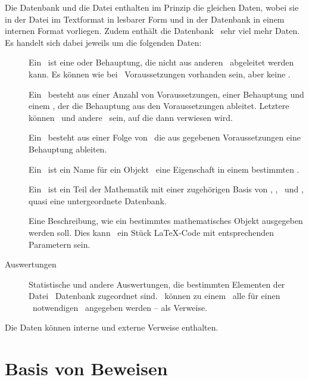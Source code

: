 Die Datenbank und die Datei enthalten im Prinzip die gleichen Daten, wobei sie in der Datei im Textformat in lesbarer Form und in der Datenbank in einem internen Format vorliegen.
Zudem enthält die Datenbank \textiAlg\ sehr viel mehr Daten. Es handelt sich dabei jeweils um die folgenden Daten:
\begin{description}
	\item[\Axiome]         \label{Daten:Axiom}
	Ein \Axiom\ ist eine \emph{\Aussage} oder Behauptung, die nicht aus anderen \Aussagen\ abgeleitet werden kann.
	Es können wie bei \Saetzen\ Voraussetzungen vorhanden sein, aber keine \Beweise.
	\item[\Saetze]          \label{Daten:Satz}
	Ein \Satz\ besteht aus einer Anzahl von Voraussetzungen, einer Behauptung und einem \Beweis, der die Behauptung aus den Voraussetzungen ableitet.
	Letztere können \Axiome\ und andere \Saetze\ sein, auf die dann verwiesen wird.
	\item[\Beweise]        \label{Daten:Beweis}
	Ein \Beweis\ besteht aus einer Folge von \Beweisschritten\, die aus gegebenen Voraussetzungen eine Behauptung ableiten.
	\item[\Fachbegriffe]   \label{Daten:Fachbegriff}
	Ein \Fachbegriff\ ist ein Name für ein Objekt \textbzw\ eine Eigenschaft in einem bestimmten \Fachgebiet.
	\item[\Fachgebiete]    \label{Daten:Fachgebiet}
	Ein \Fachgebiet\ ist ein Teil der Mathematik mit einer zugehörigen Basis von \Axiomen, \Saetzen, \Fachbegriffen\ und \Ausgabeschemata, quasi eine untergeordnete Datenbank.
	\item[\Ausgabeschemata] \label{Daten:Ausgabeschema}
	Eine Beschreibung, wie ein bestimmtes mathematisches Objekt ausgegeben werden soll.
	Dies kann \textzB\ ein Stück \LaTeX-Code mit entsprechenden Parametern sein.
	\item[Auswertungen]             \label{Daten:Auswertung}
	Statistische und andere Auswertungen, die bestimmten Elementen der Datei \textbzw\ Datenbank zugeordnet sind.
	\textZB\ können zu einem \Satz\ alle für einen \Beweis\ notwendigen \Axiome\ angegeben werden -- als Verweise.
\end{description}
Die Daten können interne und externe Verweise enthalten.

\section{Basis von Beweisen}
\label{sec:BeweisBasis}

